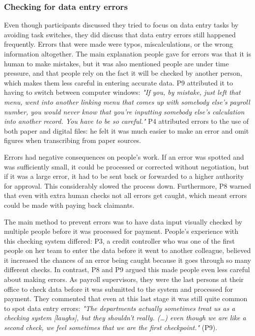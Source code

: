 \subsubsection{Checking for data entry errors}
Even though participants discussed they tried to focus on data entry tasks by avoiding task switches, they did discuss that data entry errors still happened frequently. Errors that were made were typos, miscalculations, or the wrong information altogether. The main explanation people gave for errors was that it is human to make mistakes, but it was also mentioned people are under time pressure, and that people rely on the fact it will be checked by another person, which makes them less careful in entering accurate data. P9 attributed it to having to switch between computer windows: \textit{"If you, by mistake, just left that menu, went into another linking menu that comes up with somebody else's payroll number, you would never know that you're inputting somebody else's calculation into another record. You have to be so careful."} P4 attributed errors to the use of both paper and digital files: he felt it was much easier to make an error and omit figures when transcribing from paper sources.

Errors had negative consequences on people’s work. If an error was spotted and was sufficiently small, it could be processed or corrected without negotiation, but if it was a large error, it had to be sent back or forwarded to a higher authority for approval. This considerably slowed the process down. Furthermore, P8 warned that even with extra human checks not all errors get caught, which meant errors could be made with paying back claimants.

The main method to prevent errors was to have data input visually checked by multiple people before it was processed for payment. People's experience with this checking system differed: P3, a credit controller who was one of the first people on her team to enter the data before it went to another colleague, believed it increased the chances of an error being caught because it goes through so many different checks. In contrast, P8 and P9 argued this made people even less careful about making errors. As payroll supervisors, they were the last persons at their office to check data before it was submitted to the system and processed for payment. They commented that even at this last stage it was still quite common to spot data entry errors: \textit{"The departments actually sometimes treat us as a checking system [laughs], but they shouldn't really. (…) even though we are like a second check, we feel sometimes that we are the first checkpoint."} (P9).

